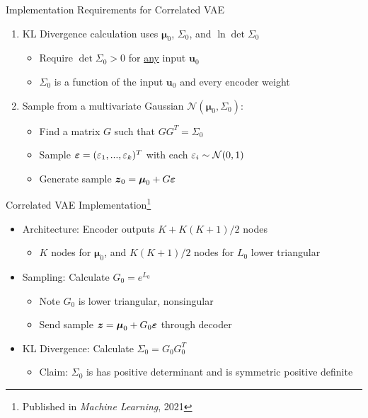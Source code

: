 \documentclass{beamer}
\def \e{\ensuremath \varepsilon}
\def \tr{\ensuremath \text{tr}}
\newcommand{\vect}[1]{\boldsymbol{#1}}
\theoremstyle{definition}
\begin{document}
\begin{frame}{Implementation Requirements for Correlated VAE}
\begin{enumerate}
  \item KL Divergence calculation uses $\vect\mu_0$, $\Sigma_0$, and $\ln\det \Sigma_0$ 
    \begin{itemize}
      \item<2-> Require $\det \Sigma_0 > 0$ for \underline{any} input $\vect u_0$
      \item<2-> $\Sigma_0$ is a function of the input $\vect u_0$ and every encoder weight 
    \end{itemize}
  \item Sample from a multivariate Gaussian $\mathcal{N}(\vect\mu_0, \Sigma_0)$:
  \begin{itemize}
    \item<3-> Find a matrix $G$ such that $G G^T = \Sigma_0$
    \item<3-> Sample $\vect\e = (\e_1,...,\e_k)^T$ with each $\e_i \sim \mathcal{N}(0,1)$
    \item<3-> Generate sample $\vect z_0 = \vect\mu_0 + G\vect\e$
  \end{itemize}
\end{enumerate}
\end{frame}

\begin{frame}{Correlated VAE Implementation\footnote{Published in \textit{Machine Learning}, 2021}}
\begin{itemize}
  \item Architecture: Encoder outputs $K + K(K+1)/2$ nodes
  \begin{itemize}
    \item $K$ nodes for $\vect\mu_0$, and $K(K+1)/2$ nodes for $L_0$ lower triangular
  \end{itemize}
  \item<2-> Sampling: Calculate $G_0 = e^{L_0}$ 
  \begin{itemize}
    \item<2-> Note $G_0$ is lower triangular, nonsingular
    \item<2-> Send sample $\vect z = \vect \mu_0 + G_0\vect\e$ through decoder
  \end{itemize}
  \item<3-> KL Divergence: Calculate $\Sigma_0 = G_0 G_0^T$
  \begin{itemize}
\item<4-> Claim: $\Sigma_0$ is has positive determinant and is symmetric positive definite
  \end{itemize}
\end{itemize}
\end{frame}
\end{document}
